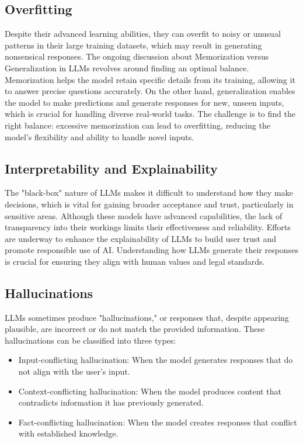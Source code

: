 \subsection{Overfitting}
Despite their advanced learning abilities, they can overfit to noisy or unusual patterns in their large training datasets, which may result in generating nonsensical responses. The ongoing discussion about Memorization versus Generalization in LLMs revolves around finding an optimal balance. Memorization helps the model retain specific details from its training, allowing it to answer precise questions accurately. On the other hand, generalization enables the model to make predictions and generate responses for new, unseen inputs, which is crucial for handling diverse real-world tasks. The challenge is to find the right balance: excessive memorization can lead to overfitting, reducing the model's flexibility and ability to handle novel inputs.
\subsection{ Interpretability and Explainability}
The "black-box" nature of LLMs makes it difficult to understand how they make decisions, which is vital for gaining broader acceptance and trust, particularly in sensitive areas. Although these models have advanced capabilities, the lack of transparency into their workings limits their effectiveness and reliability. Efforts are underway to enhance the explainability of LLMs to build user trust and promote responsible use of AI. Understanding how LLMs generate their responses is crucial for ensuring they align with human values and legal standards.
\subsection{ Hallucinations}
LLMs sometimes produce "hallucinations," or responses that, despite appearing plausible, are incorrect or do not match the provided information. These hallucinations can be classified into three types:

\begin{itemize}
	\item Input-conflicting hallucination: When the model generates responses that do not align with the user's input.
	\item Context-conflicting hallucination: When the model produces content that contradicts information it has previously generated.
	\item Fact-conflicting hallucination: When the model creates responses that conflict with established knowledge.
\end{itemize}
